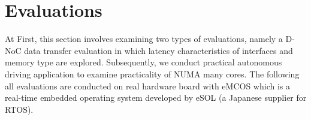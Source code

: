 \documentclass[conference,compsoc]{IEEEtran}
\newcommand{\comment}[1]{}
\begin{document}







\vspace{-2mm}
\section{Evaluations}
\label{sec:evaluations}
\vspace{-3mm}
At First, this section involves examining two types of evaluations, namely a D-NoC data transfer evaluation in which latency characteristics of interfaces and memory type are explored.
Subsequently, we conduct practical autonomous driving application to examine practicality of NUMA many cores.
The following all evaluations are conducted on real hardware board with eMCOS which is a real-time embedded operating system developed by eSOL (a Japanese supplier for RTOS).
\end{document}
